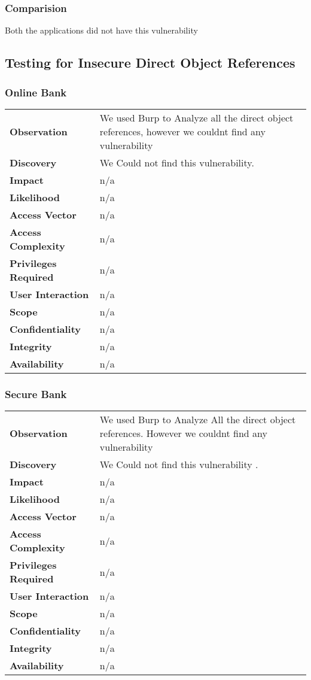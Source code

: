 \subsubsection{Comparision}
Both the applications did not have this vulnerability
\subsection{Testing for Insecure Direct Object References}
\subsubsection{Online Bank}
\begin{tabular}{l|p{10cm}}
\textbf{Observation} & We used Burp to Analyze all the direct object references, however we couldnt find any vulnerability  \\
\textbf{Discovery} & We Could not find this vulnerability. \\
\textbf{Impact} &  n/a\\
\textbf{Likelihood} & n/a \\
\textbf{Access Vector} & n/a \\
\textbf{Access Complexity} & n/a \\
\textbf{Privileges Required} & n/a \\
\textbf{User Interaction} & n/a \\
\textbf{Scope} & n/a \\
\textbf{Confidentiality} & n/a \\
\textbf{Integrity} & n/a \\
\textbf{Availability} & n/a \\
\end{tabular}

\subsubsection{Secure Bank}
\begin{tabular}{l|p{10cm}}
\textbf{Observation} & We used Burp to Analyze All the direct object references. However we couldnt find any vulnerability  \\
\textbf{Discovery} & We Could not find this vulnerability . \\
\textbf{Impact} &  n/a\\
\textbf{Likelihood} & n/a \\
\textbf{Access Vector} & n/a \\
\textbf{Access Complexity} & n/a \\
\textbf{Privileges Required} & n/a \\
\textbf{User Interaction} & n/a \\
\textbf{Scope} & n/a \\
\textbf{Confidentiality} & n/a \\
\textbf{Integrity} & n/a \\
\textbf{Availability} & n/a \\
\end{tabular}
